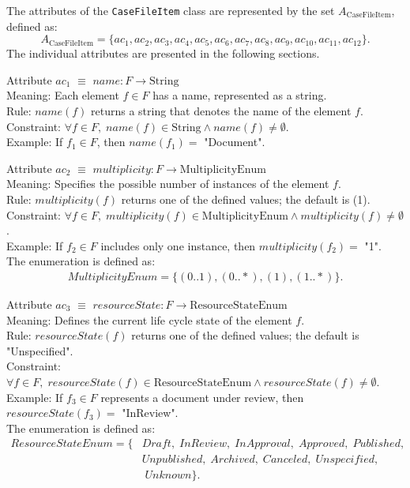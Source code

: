 \documentclass{article}
\begin{document}
The attributes of the \texttt{CaseFileItem} class are represented by the set \( A_{\text{CaseFileItem}} \), defined as:
\[
A_{\text{CaseFileItem}} = \{ ac_1, ac_2, ac_3, ac_4, ac_5, ac_6, ac_7, ac_8, ac_9, ac_{10}, ac_{11}, ac_{12} \}.
\]
The individual attributes are presented in the following sections.

Attribute \( ac_1 \) $\equiv$ \( name : F \rightarrow \text{String} \) \\
Meaning: Each element \( f \in F \) has a name, represented as a string. \\
Rule: \( name(f) \) returns a string that denotes the name of the element \( f \). \\
Constraint: \( \forall f \in F,\; name(f) \in \text{String} \wedge name(f) \neq \emptyset \). \\
Example: If \( f_1 \in F \), then \( name(f_1) = \) "Document".

\vspace{0.8em}

Attribute \( ac_2 \) $\equiv$ \( multiplicity : F \rightarrow \text{MultiplicityEnum} \) \\
Meaning: Specifies the possible number of instances of the element \( f \). \\
Rule: \( multiplicity(f) \) returns one of the defined values; the default is (1). \\
Constraint: \( \forall f \in F,\; multiplicity(f) \in \text{MultiplicityEnum} \wedge multiplicity(f) \neq \emptyset \). \\
Example: If \( f_2 \in F \) includes only one instance, then \( multiplicity(f_2) = \) "1". \\
The enumeration  is defined as:
{\begin{align*}
MultiplicityEnum = \{ (0..1), (0..*), (1), (1..*) \}.
\end{align*}}

\vspace{0.8em}

Attribute \( ac_3 \) $\equiv$ \( resourceState : F \rightarrow \text{ResourceStateEnum} \) \\
Meaning: Defines the current life cycle state of the element \( f \). \\
Rule: \( resourceState(f) \) returns one of the defined values; the default is "Unspecified". \\
Constraint: \( \forall f \in F,\; resourceState(f) \in \text{ResourceStateEnum} \wedge resourceState(f) \neq \emptyset \). \\
Example: If \( f_3 \in F \) represents a document under review, then \( resourceState(f_3) = \) "InReview". \\
The enumeration  is defined as:
{\begin{align*}
ResourceStateEnum = \{ &Draft,\;InReview,\;InApproval,\;Approved,\;Published,\nonumber \\  
&Unpublished,\;Archived,\;Canceled,\;Unspecified,\\ 
&\;Unknown \}.
\end{align*}}
\end{document}
